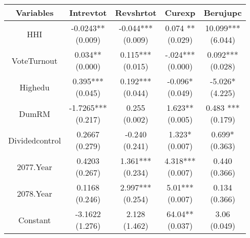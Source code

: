 \begin{table}[ht]
\centering
\begin{tabular}{|ccccc|}
\hline
\textbf{Variables} & \textbf{Intrevtot} & \textbf{Revshrtot} & \textbf{Curexp} & \textbf{Berujupc} \\
\hline
HHI & \makecell{-0.0243** \\ (0.009)} & \makecell{-0.044*** \\ (0.009)} & \makecell{0.074 **\\ (0.029)} & \makecell{10.099*** \\ (6.044)} \\

VoteTurnout& \makecell{0.034** \\ (0.000)} & \makecell{0.115*** \\ (0.015)} & \makecell{-.024***\\ (0.000)} & \makecell{0.092*** \\ (0.028)} \\

Highedu & \makecell{0.395*** \\ (0.045)} & \makecell{0.192*** \\ (0.044)} & \makecell{-0.096* \\ (0.049)} & \makecell{-5.026* \\ (4.225)} \\
DumRM & \makecell{-1.7265*** \\ (0.217)} & \makecell{0.255\\ (0.002)} & \makecell{1.623**\\ (0.005)} & \makecell{0.483 ***\\ (0.179)} \\
Dividedcontrol & \makecell{0.2667 \\ (0.279)} & \makecell{-0.240\\ (0.241)} & \makecell{1.323*\\ (0.007)} & \makecell{0.699*\\ (0.363)} \\
2077.Year& \makecell{0.4203 \\ (0.267)} & \makecell{1.361***\\ (0.234)} & \makecell{4.318***\\ (0.007)} & \makecell{0.440\\ (0.366)} \\
2078.Year & \makecell{0.1168 \\ (0.246)} & \makecell{2.997***\\ (0.254)} & \makecell{5.01***\\ (0.007)} & \makecell{0.134\\ (0.366)} \\
Constant & \makecell{-3.1622 \\ (1.276)} & \makecell{2.128 \\ (1.462)} & \makecell{64.04** \\ (0.037)} & \makecell{3.06 \\ (0.049)} \\\hline


\end{tabular}
\end{table}
